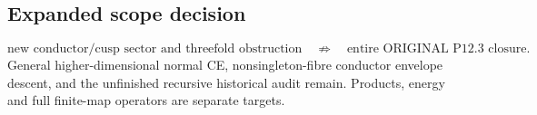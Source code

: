 \subsection*{Expanded scope decision}
\[
\text{new conductor/cusp sector and threefold obstruction}
\quad\not\Longrightarrow\quad\text{entire ORIGINAL P12.3 closure}.
\]
General higher-dimensional normal CE, nonsingleton-fibre conductor
envelope descent, and the unfinished recursive historical audit remain.
Products, energy and full finite-map operators are separate targets.


